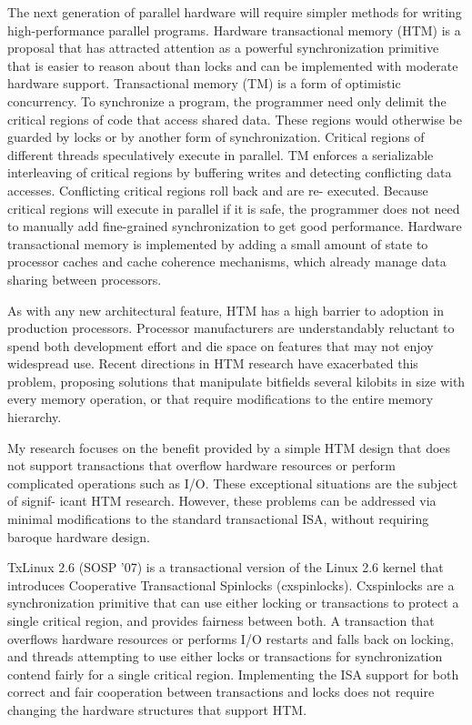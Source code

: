 \documentclass{article}
\begin{document}
The next generation of parallel hardware will require simpler methods for
writing high-performance parallel programs.  Hardware transactional memory
(HTM) is a proposal that has attracted attention as a powerful
synchronization primitive that is easier to reason about than locks and can
be implemented with moderate hardware support. Transactional memory (TM) is
a form of optimistic concurrency. To synchronize a program, the programmer
need only delimit the critical regions of code that access shared data.
These regions would otherwise be guarded by locks or by another form of
synchronization.  Critical regions of different threads speculatively
execute in parallel. TM enforces a serializable interleaving of critical
regions by buffering writes and detecting conflicting data accesses.
Conflicting critical regions roll back and are re- executed. Because
critical regions will execute in parallel if it is safe, the programmer
does not need to manually add fine-grained synchronization to get good
performance. Hardware transactional memory is implemented by adding a small
amount of state to processor caches and cache coherence mechanisms, which
already manage data sharing between processors.

As with any new architectural feature, HTM has a high barrier to adoption
in production processors. Processor manufacturers are understandably
reluctant to spend both development effort and die space on features that
may not enjoy widespread use. Recent directions in HTM research have
exacerbated this problem, proposing solutions that manipulate bitfields
several kilobits in size with every memory operation, or that require
modifications to the entire memory hierarchy.

My research focuses on the benefit provided by a simple HTM design that
does not support transactions that overflow hardware resources or perform
complicated operations such as I/O. These exceptional situations are the
subject of signif- icant HTM research. However, these problems can be
addressed via minimal modifications to the standard transactional ISA,
without requiring baroque hardware design.

TxLinux 2.6 (SOSP ’07) is a transactional version of the Linux 2.6 kernel
that introduces Cooperative Transactional Spinlocks (cxspinlocks).
Cxspinlocks are a synchronization primitive that can use either locking or
transactions to protect a single critical region, and provides fairness
between both. A transaction that overflows hardware resources or performs
I/O restarts and falls back on locking, and threads attempting to use
either locks or transactions for synchronization contend fairly for a
single critical region. Implementing the ISA support for both correct and
fair cooperation between transactions and locks does not require changing
the hardware structures that support HTM.
\end{document}
